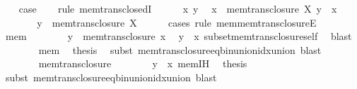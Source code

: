 \begin{isabellebody}
\ \ \isamarkupfalse%
\ {\isacharquery}{\kern0pt}case\isanewline
\ \ \isamarkupfalse%
\ {\isacharparenleft}{\kern0pt}rule\ mem{\isacharunderscore}{\kern0pt}trans{\isacharunderscore}{\kern0pt}closedI{\isacharprime}{\kern0pt}{\isacharparenright}{\kern0pt}\isanewline
\ \ \ \ \isamarkupfalse%
\ x\ y\ \isamarkupfalse%
\ {\isachardoublequoteopen}x\ {\isasymin}\ mem{\isacharunderscore}{\kern0pt}trans{\isacharunderscore}{\kern0pt}closure\ X{\isachardoublequoteclose}\ {\isachardoublequoteopen}y\ {\isasymin}\ x{\isachardoublequoteclose}\isanewline
\ \ \ \ \isamarkupfalse%
\ \isamarkupfalse%
\ {\isachardoublequoteopen}y\ {\isasymin}\ mem{\isacharunderscore}{\kern0pt}trans{\isacharunderscore}{\kern0pt}closure\ X{\isachardoublequoteclose}\isanewline
\ \ \ \ \isamarkupfalse%
\ {\isacharparenleft}{\kern0pt}cases\ rule{\isacharcolon}{\kern0pt}\ mem{\isacharunderscore}{\kern0pt}mem{\isacharunderscore}{\kern0pt}trans{\isacharunderscore}{\kern0pt}closureE{\isacharparenright}{\kern0pt}\isanewline
\ \ \ \ \ \ \isamarkupfalse%
\ mem\isanewline
\ \ \ \ \ \ \isamarkupfalse%
\ {\isachardoublequoteopen}y\ {\isasymin}\ mem{\isacharunderscore}{\kern0pt}trans{\isacharunderscore}{\kern0pt}closure\ x{\isachardoublequoteclose}\ \isamarkupfalse%
\ {\isacartoucheopen}y\ {\isasymin}\ x{\isacartoucheclose}\ subset{\isacharunderscore}{\kern0pt}mem{\isacharunderscore}{\kern0pt}trans{\isacharunderscore}{\kern0pt}closure{\isacharunderscore}{\kern0pt}self\ \isamarkupfalse%
\ blast\isanewline
\ \ \ \ \ \ \isamarkupfalse%
\ mem\ \isamarkupfalse%
\ {\isacharquery}{\kern0pt}thesis\ \isamarkupfalse%
\ {\isacharparenleft}{\kern0pt}subst\ mem{\isacharunderscore}{\kern0pt}trans{\isacharunderscore}{\kern0pt}closure{\isacharunderscore}{\kern0pt}eq{\isacharunderscore}{\kern0pt}bin{\isacharunderscore}{\kern0pt}union{\isacharunderscore}{\kern0pt}idx{\isacharunderscore}{\kern0pt}union{\isacharparenright}{\kern0pt}\ blast\isanewline
\ \ \ \ \isamarkupfalse%
\isanewline
\ \ \ \ \ \ \isamarkupfalse%
\ mem{\isacharunderscore}{\kern0pt}trans{\isacharunderscore}{\kern0pt}closure\isanewline
\ \ \ \ \ \ \isamarkupfalse%
\ {\isacartoucheopen}y\ {\isasymin}\ x{\isacartoucheclose}\ mem{\isachardot}{\kern0pt}IH\ \isamarkupfalse%
\ {\isacharquery}{\kern0pt}thesis\ \isamarkupfalse%
\ {\isacharparenleft}{\kern0pt}subst\ mem{\isacharunderscore}{\kern0pt}trans{\isacharunderscore}{\kern0pt}closure{\isacharunderscore}{\kern0pt}eq{\isacharunderscore}{\kern0pt}bin{\isacharunderscore}{\kern0pt}union{\isacharunderscore}{\kern0pt}idx{\isacharunderscore}{\kern0pt}union{\isacharparenright}{\kern0pt}\ blast\isanewline

\end{isabellebody}
